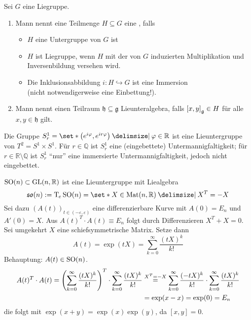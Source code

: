 \begin{definition}[{name=[{Lieuntergruppe}]}]
	Sei $G$ eine Liegruppe.
	\begin{enumerate}[1)]
		\item Mann nennt eine Teilmenge $H \subseteq G$ eine , falls 
		\begin{itemize}
			\item $H$ eine Untergruppe von $G$ ist
			\item $H$ ist Liegruppe, wenn $H$ mit der von $G$ induzierten Multiplikation und Inversenbildung versehen wird.
			\item Die Inklusionsabbildung $i \colon H \hookrightarrow G$ ist eine Immersion \\ 
			(nicht notwendigerweise eine Einbettung!).
		\end{itemize}
		\item Mann nennt einen Teilraum $\mathfrak{h} \subseteq \mathfrak{g}$ Lieunteralgebra, falls $\benbrace*{x,y}_\mathfrak{g} \in H$ für alle $x,y \in \mathfrak{h}$ gilt.
	\end{enumerate}
\end{definition}
 
Die Gruppe $S^1_r = \set*{\enbrace*{e^{i \varphi}, e^{i r \varphi}} \given \varphi \in \mathbb{R}}$ ist eine Lieuntergruppe von $T^2=S^1 \times S^1$.
Für $r \in \mathbb{Q}$ ist $S^1_r$ eine (eingebettete) Untermannigfaltigkeit; für $r \in \mathbb{R}\setminus \mathbb{Q}$ ist $S^1_r$ \enquote{nur} eine immersierte Untermannigfaltigkeit, jedoch nicht eingebettet.

$\SO(n) \subset \GL(n,\mathbb{R})$ ist eine Lieuntergruppe mit Liealgebra 
\[
	\mathfrak{so}(n) := \Tmap_e \SO(n) = \set*{X \in \Mat(n,\mathbb{R}) \given X^T=-X}
\]
Sei dazu $(A(t))_{t \in (-\varepsilon,\varepsilon)}$ eine differenzierbare Kurve mit $A(0)=E_n$ und $A'(0)=X$.
Aus $A(t)^T \cdot A(t) \equiv E_n$ folgt durch Differenzieren $X^T + X =0$.
Sei umgekehrt $X$ eine schiefsymmetrische Matrix.
Setze dann 
\[
	A(t) =\exp(t X) = \sum_{k=0}^{\infty} \frac{(tX)^k}{k!} 
\]
Behauptung: $A(t) \in \SO(n)$.
\begin{align}
	A(t)^T \cdot A(t) = \enbrace*{\sum_{k=0}^{\infty} \frac{(tX)^k}{k!} }^T \cdot \sum_{k=0}^{\infty} \frac{(tX)^k}{k!} &\stackrel{X^T=-X}{= }\sum_{k=0}^{\infty} \frac{(-tX)^k}{k!}  \cdot \sum_{k=0}^{\infty} \frac{(tX)^k}{k!} \\
	&= \exp(x-x) = \exp(0) =E_n
\end{align}
die folgt mit $\exp(x+y)= \exp(x) \exp(y)$, da $[x,y]=0$.

